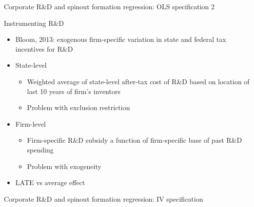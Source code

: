 \documentclass[english,usenames,dvipsnames]{beamer}
\begin{document}
\begin{frame}{Corporate R\&D and spinout formation regression: OLS specification 2}
\begin{table}
\Tiny
\centering

\caption{\tiny The dependent variable is the average yearly number of founders from the parent firm joining startups in years $t+1,t+2,t+3$, normalized by a trailing five-year moving average of assets. Independent variables are also normalized by assets. Standard errors are clustered at the firm level.}
\label{table:RDandSpinoutFormation_at_founder2_l3f3}
\end{table}
\end{frame}

\begin{frame}{Instrumenting R\&D}
\begin{itemize}
	\item Bloom, 2013: exogenous firm-specific variation in state and federal tax incentives for R\&D
	\item State-level
	\begin{itemize}
		\item Weighted average of state-level after-tax cost of R\&D based on location of last 10 years of firm's inventors
		\item Problem with exclusion restriction
	\end{itemize}
	\item Firm-level
	\begin{itemize}
		\item Firm-specific R\&D subsidy a function of firm-specific base of past R\&D spending
		\item Problem with exogeneity
	\end{itemize}
	\item LATE vs average effect
\end{itemize}
\end{frame}

\begin{frame}{Corporate R\&D and spinout formation regression: IV specification}
\begin{table}
\Tiny
\centering

\caption{\tiny The dependent variable is the log of the average yearly number of founders from the parent firm joining startups, over the years $t+1,t+2,t+3$. Independent variables are similarly averaged over $t,t-1,t-2$. Columns (1) and (5) are estimated by OLS. The remaining columns columns are estimated by instrumenting R\&D spending using firm-specific tax incentives for R\&D, from Bloom 2013. Standard errors are clustered at the firm level.}
\label{table:RDandSpinoutFormation_iv_founder2_l3f3}
\end{table}
\end{frame}
\end{document}
